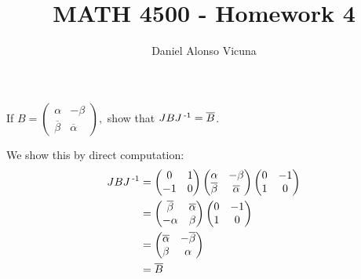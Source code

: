 \documentclass[11pt,onecolumn]{article}
\title{MATH 4500 - Homework 4}
\author{Daniel Alonso Vicuna}
\newcommand{\nn}{_{2n}}
\begin{document}
\maketitle
\begin{comment}
For this problem set, we will let $$ J = \begin{pmatrix} 0& 1 \\ -1 & 0\end{pmatrix} \qquad  J\nn = \begin{pmatrix} J & 0 & 0 & ... & 0 \\ 0 & J & 0 & ... & 0 \\ .. & .. & .. & .. & .. \\ 0 & 0 & 0 & ... & J\end{pmatrix} $$
\end{comment}
\begin{exercise}
If $B  = \begin{pmatrix}
\alpha & -\beta \\ \overline{\beta} & \overline{\alpha} \end{pmatrix},$ show that $JBJ\operatorname{^{-1}} = \overline{B}$.
\end{exercise}
\begin{answer}
We show this by direct computation:
\begin{align*}
    JBJ\operatorname{^{-1}} &= \begin{pmatrix} 0& 1 \\ -1 & 0\end{pmatrix} \begin{pmatrix} \alpha & -\beta \\ \overline{\beta} & \overline{\alpha} \end{pmatrix} \begin{pmatrix} 0& -1 \\ 1 & 0\end{pmatrix} \\
    &= \begin{pmatrix} \overline{\beta} & \overline{\alpha} \\ -\alpha & \beta \end{pmatrix}\begin{pmatrix} 0& -1 \\ 1 & 0\end{pmatrix} \\
    &= \begin{pmatrix}\overline{\alpha} & -\overline{\beta} \\ \beta & \alpha \end{pmatrix} \\
    &= \overline{B}
\end{align*}
\end{answer}
\end{document}

